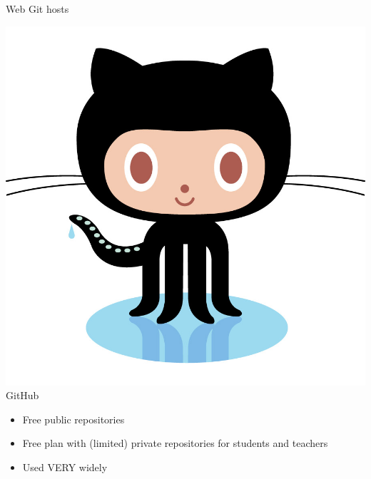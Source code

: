 \documentclass[xcolor=dvipsnames]{beamer}
\begin{document}
\begin{frame}{Web Git hosts}

\includegraphics[scale=.03]{octocat} {\LARGE GitHub}
\begin{itemize}
\item Free public repositories
\item Free plan with (limited) private repositories for students and teachers
\item Used VERY widely
\end{itemize}


\end{frame}
\end{document}
